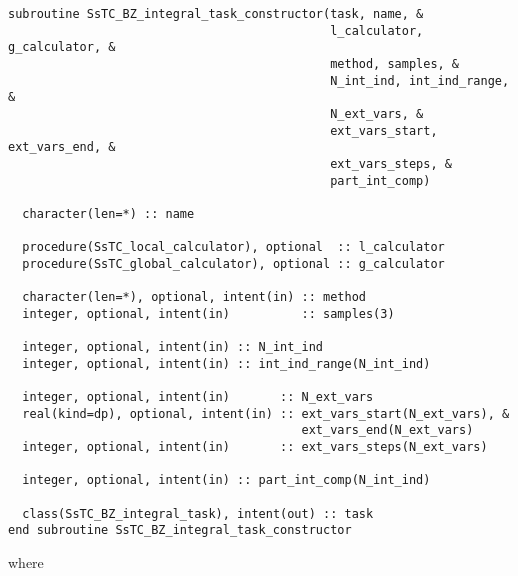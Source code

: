 \documentclass[10pt,a4paper]{article}
\begin{document}
\begin{lstlisting}[caption={Interface of the ``integrator" constructor.},captionpos=b]
subroutine SsTC_BZ_integral_task_constructor(task, name, &
                                             l_calculator, g_calculator, &
                                             method, samples, &
                                             N_int_ind, int_ind_range, &
                                             N_ext_vars, &
                                             ext_vars_start, ext_vars_end, &
                                             ext_vars_steps, &
                                             part_int_comp)

  character(len=*) :: name

  procedure(SsTC_local_calculator), optional  :: l_calculator
  procedure(SsTC_global_calculator), optional :: g_calculator

  character(len=*), optional, intent(in) :: method
  integer, optional, intent(in)          :: samples(3)

  integer, optional, intent(in) :: N_int_ind
  integer, optional, intent(in) :: int_ind_range(N_int_ind)

  integer, optional, intent(in)       :: N_ext_vars
  real(kind=dp), optional, intent(in) :: ext_vars_start(N_ext_vars), &
                                         ext_vars_end(N_ext_vars)
  integer, optional, intent(in)       :: ext_vars_steps(N_ext_vars)

  integer, optional, intent(in) :: part_int_comp(N_int_ind)

  class(SsTC_BZ_integral_task), intent(out) :: task
end subroutine SsTC_BZ_integral_task_constructor
\end{lstlisting}
where
\end{document}
